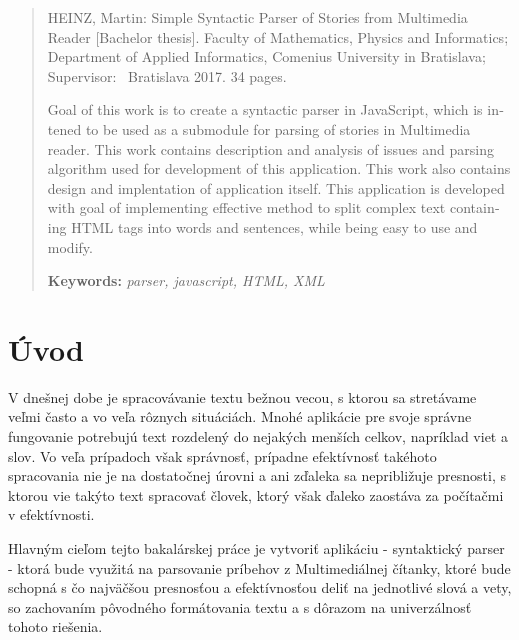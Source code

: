 \documentclass[12pt,a4paper]{report}
\theoremstyle{definition}
\theoremstyle{remark}
\begin{document}
\begin{otherlanguage}{english}
\begin{abstract}

HEINZ, Martin: Simple Syntactic Parser of Stories from Multimedia Reader [Bachelor thesis]. Faculty of Mathematics, Physics and Informatics;
Department of Applied Informatics, Comenius University in Bratislava; Supervisor: \skolitel \ Bratislava 2017. 34 pages.


\bigskip

Goal of this work is to create a syntactic parser in JavaScript, which is intened to be used as a submodule for parsing of stories in Multimedia reader. This work contains description and analysis of issues and parsing algorithm used for development of this application. This work also contains design and implentation of application itself. This application is developed with goal of implementing effective method to split complex text containing HTML tags into words and sentences, while being easy to use and modify.

\bigskip\noindent
\textbf{Keywords:} \textit{parser, javascript, HTML, XML} 



\end{abstract}
\end{otherlanguage}
\cleardoublepage
{}
\setcounter{tocdepth}{1}
\tableofcontents
\cleardoublepage
{}

\chapter*{Úvod}
V dnešnej dobe je spracovávanie textu bežnou vecou, s ktorou sa stretávame veľmi často a vo veľa rôznych situáciách. Mnohé aplikácie pre svoje správne fungovanie potrebujú text rozdelený do nejakých menších celkov, napríklad viet a slov. Vo veľa prípadoch však správnosť, prípadne efektívnosť takéhoto spracovania nie je na dostatočnej úrovni a ani zďaleka sa nepribližuje presnosti, s ktorou vie takýto text spracovať človek, ktorý však ďaleko zaostáva za počítačmi v efektívnosti.
\bigskip


Hlavným cieľom tejto bakalárskej práce je vytvoriť aplikáciu  - syntaktický parser - ktorá bude využitá na parsovanie príbehov z Multimediálnej čítanky, ktoré bude schopná s čo najväčšou presnosťou a efektívnosťou deliť na jednotlivé slová a vety, so zachovaním pôvodného formátovania textu a s dôrazom na univerzálnosť tohoto riešenia.
\bigskip
\end{document}
